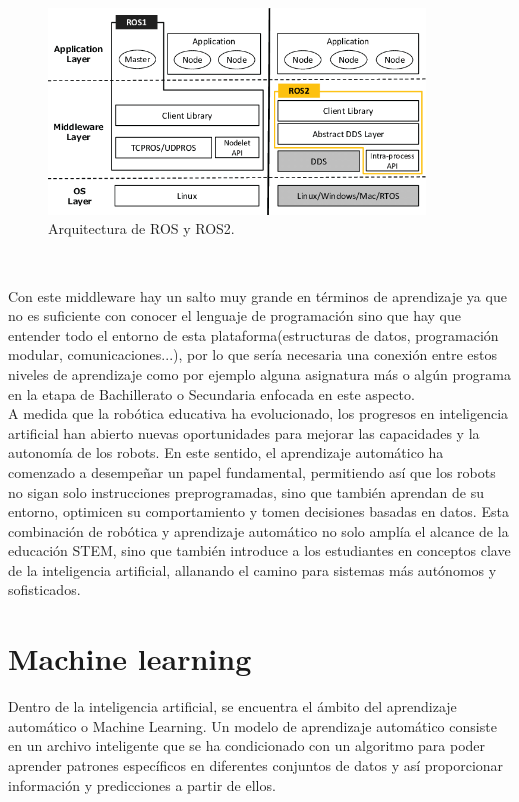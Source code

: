 \begin{figure} [h!]
  \begin{center}
    \includegraphics[width=10cm]{figs/ros.png}
  \end{center}
  \caption{Arquitectura de ROS y ROS2.}
  \label{fig:ros}
\end{figure}\

Con este middleware hay un salto muy grande en términos de aprendizaje ya que no es suficiente con conocer el lenguaje de programación sino que hay que entender todo el entorno de esta plataforma(estructuras de datos, programación modular, comunicaciones...), por lo que sería necesaria una conexión entre estos niveles de aprendizaje como por ejemplo alguna asignatura más o algún programa en la etapa de Bachillerato o Secundaria enfocada en este aspecto.\\

A medida que la robótica educativa ha evolucionado, los progresos en inteligencia artificial han abierto nuevas oportunidades para mejorar las capacidades y la autonomía de los robots. En este sentido, el aprendizaje automático ha comenzado a desempeñar un papel fundamental, permitiendo así que los robots no sigan solo instrucciones preprogramadas, sino que también aprendan de su entorno, optimicen su comportamiento y tomen decisiones basadas en datos. Esta combinación de robótica y aprendizaje automático no solo amplía el alcance de la educación STEM, sino que también introduce a los estudiantes en conceptos clave de la inteligencia artificial, allanando el camino para sistemas más autónomos y sofisticados.


\section{Machine learning}


Dentro de la inteligencia artificial, se encuentra el ámbito del aprendizaje automático o Machine Learning. Un modelo de aprendizaje automático consiste en un archivo inteligente que se ha condicionado con un algoritmo para poder aprender patrones específicos en diferentes conjuntos de datos y así proporcionar información y predicciones a partir de ellos.\\

